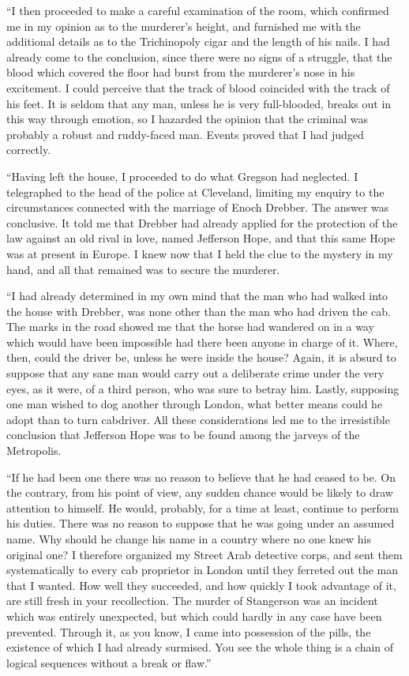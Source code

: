 \documentclass[12pt,english,oneside]{book}
\begin{document}
{}``I then proceeded to make a careful examination of the room, which
confirmed me in my opinion as to the murderer's height, and furnished
me with the additional details as to the Trichinopoly cigar and the
length of his nails. I had already come to the conclusion, since there
were no signs of a struggle, that the blood which covered the floor
had burst from the murderer's nose in his excitement. I could perceive
that the track of blood coincided with the track of his feet. It is
seldom that any man, unless he is very full-blooded, breaks out in
this way through emotion, so I hazarded the opinion that the criminal
was probably a robust and ruddy-faced man. Events proved that I had
judged correctly.

{}``Having left the house, I proceeded to do what Gregson had neglected.
I telegraphed to the head of the police at Cleveland, limiting my
enquiry to the circumstances connected with the marriage of Enoch
Drebber. The answer was conclusive. It told me that Drebber had already
applied for the protection of the law against an old rival in love,
named Jefferson Hope, and that this same Hope was at present in Europe.
I knew now that I held the clue to the mystery in my hand, and all
that remained was to secure the murderer.

{}``I had already determined in my own mind that the man who had
walked into the house with Drebber, was none other than the man who
had driven the cab. The marks in the road showed me that the horse
had wandered on in a way which would have been impossible had there
been anyone in charge of it. Where, then, could the driver be, unless
he were inside the house? Again, it is absurd to suppose that any
sane man would carry out a deliberate crime under the very eyes, as
it were, of a third person, who was sure to betray him. Lastly, supposing
one man wished to dog another through London, what better means could
he adopt than to turn cabdriver. All these considerations led me to
the irresistible conclusion that Jefferson Hope was to be found among
the jarveys of the Metropolis.

{}``If he had been one there was no reason to believe that he had
ceased to be. On the contrary, from his point of view, any sudden
chance would be likely to draw attention to himself. He would, probably,
for a time at least, continue to perform his duties. There was no
reason to suppose that he was going under an assumed name. Why should
he change his name in a country where no one knew his original one?
I therefore organized my Street Arab detective corps, and sent them
systematically to every cab proprietor in London until they ferreted
out the man that I wanted. How well they succeeded, and how quickly
I took advantage of it, are still fresh in your recollection. The
murder of Stangerson was an incident which was entirely unexpected,
but which could hardly in any case have been prevented. Through it,
as you know, I came into possession of the pills, the existence of
which I had already surmised. You see the whole thing is a chain of
logical sequences without a break or flaw.''
\end{document}
